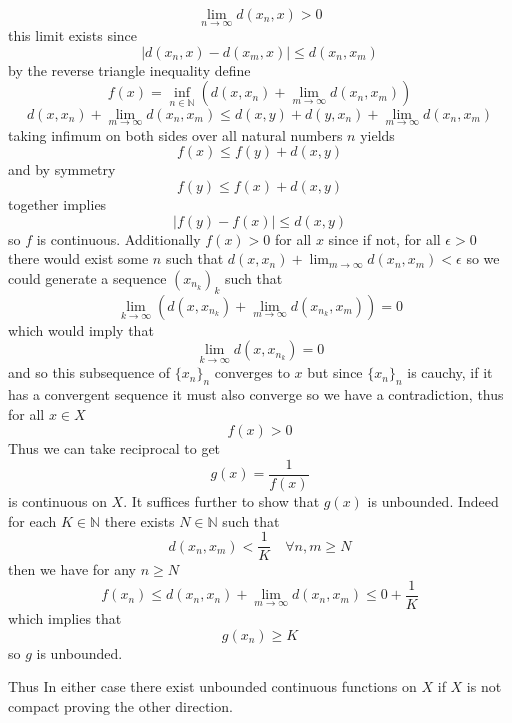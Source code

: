 \documentclass[11pt]{article}
\begin{document}
{\begin{enumerate}
             \[
            \lim_{n\to \infty}d(x_n,x) > 0
            \] 
            this limit exists since
            \[
            |d(x_n,x) - d(x_m,x)| \le d(x_n,x_m)
            \] 
            by the reverse triangle inequality
            define
            \[
                f(x) = \inf_{n \in \mathbb{N}}(d(x,x_n) + \lim_{m\to \infty}d(x_n,x_m))
            \] 
            \[
            d(x,x_n) + \lim_{m\to \infty}d(x_n,x_m) \le d(x,y) + d(y,x_n) + \lim_{m\to \infty}d(x_n,x_m)
            \] 
            taking infimum on both sides over all natural numbers $n$ yields
             \[
            f(x) \le f(y) + d(x,y)
            \] 
            and by symmetry
            \[
            f(y) \le f(x) + d(x,y)
            \] 
            together implies
            \[
            |f(y) - f(x)| \le d(x,y)
            \] 
            so  $f$ is continuous. Additionally  $f(x) > 0$ for all  $x$ since if not, for all  $\epsilon > 0$ there would exist
            some $n$ such that $d(x,x_n) + \lim_{m\to \infty}d(x_n,x_m) < \epsilon$ so we could generate a sequence $(x_{n_k})_k$ such that
             \[
                 \lim_{k\to \infty}(d(x,x_{n_k})  + \lim_{m\to \infty}d(x_{n_k},x_m)) = 0
            \] 
            which would imply that
            \[
                \lim_{k\to \infty}d(x,x_{n_k}) = 0
            \] 
            and so this subsequence of $\{x_n\}_n$ converges to  $x$ but since  $\{x_n\}_n$ is cauchy, if it has a convergent sequence it must also converge
            so we have a contradiction, thus for all  $x \in X$
             \[
            f(x) > 0
            \] 
            Thus we can take reciprocal to get
            \[
            g(x) = \frac{1}{f(x)}
            \] 
            is continuous on $X$. It suffices further to show that $g(x)$ is unbounded. Indeed for each  $K \in \mathbb{N}$ there exists $N \in \mathbb{N}$
            such that
            \[
            d(x_n,x_m) < \frac{1}{K} \quad \forall n,m \ge N
            \] 
            then we have for any $n \ge N$
            \[
            f(x_n) \le d(x_n,x_n) + \lim_{m\to \infty}d(x_n,x_m) \le 0 + \frac{1}{K}
            \] 
            which implies that
            \[
            g(x_n) \ge K
            \] 
            so $g$ is unbounded.
    \end{enumerate}
    Thus In either case there exist unbounded continuous functions on $X$ if $X$ is not compact proving the other direction.
}
\end{document}
